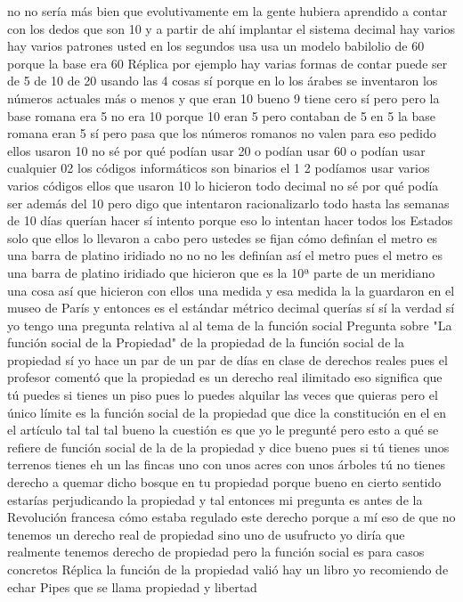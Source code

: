 no no sería más bien que evolutivamente
em la gente hubiera aprendido a contar con los dedos que son 10 y a partir de ahí implantar el sistema decimal
hay varios hay varios patrones usted en los segundos usa usa un modelo babilolio de 60 porque la base era 60
Réplica
por ejemplo hay varias formas de contar puede ser de 5 de 10 de 20 usando las 4 cosas
sí porque en lo los árabes se inventaron los números actuales más o menos
y que eran 10 bueno 9 tiene cero sí pero pero la base romana era 5
no era 10 porque 10 eran 5 pero contaban de 5 en 5 la base romana eran 5 sí
pero pasa que los números romanos no valen para eso pedido ellos usaron 10 no sé por qué podían usar 20
o podían usar 60 o podían usar cualquier 02 los códigos informáticos son binarios el 1 2
podíamos usar varios varios códigos ellos que usaron 10 lo hicieron todo decimal no sé por qué podía ser además del 10
pero digo que intentaron racionalizarlo todo hasta las semanas de 10 días querían hacer
sí intento porque eso lo intentan hacer todos los Estados solo que ellos lo llevaron a cabo pero ustedes se fijan cómo definían el metro
es una barra de platino iridiado no no no les definían así el metro pues el metro es una barra de platino iridiado que hicieron que es la 10ª parte de un meridiano
una cosa así que hicieron con ellos una medida y esa medida la la guardaron en el museo de París y entonces es el estándar métrico decimal
querías sí sí la verdad sí yo tengo una pregunta relativa al al tema de la función social
Pregunta sobre "La función social de la Propiedad"
de la propiedad de la función social de la propiedad sí yo hace un par de un par de días en clase de derechos reales
pues el profesor comentó que la propiedad es un derecho real ilimitado eso significa que tú puedes
si tienes un piso pues lo puedes alquilar las veces que quieras pero el único límite
es la función social de la propiedad que dice la constitución en el en el artículo tal tal tal bueno la cuestión es que yo le pregunté
pero esto a qué se refiere de función social de la de la propiedad y dice bueno pues si tú tienes unos terrenos tienes
eh un las fincas uno con unos acres con unos árboles tú no tienes derecho a quemar
dicho bosque en tu propiedad porque bueno en cierto sentido estarías perjudicando la propiedad y tal
entonces mi pregunta es antes de la Revolución francesa cómo estaba regulado este derecho
porque a mí eso de que no tenemos un derecho real de propiedad sino uno de usufructo
yo diría que realmente tenemos derecho de propiedad pero la función social es para casos concretos
Réplica
la función de la propiedad valió hay un libro yo recomiendo de echar Pipes que se llama propiedad y libertad
